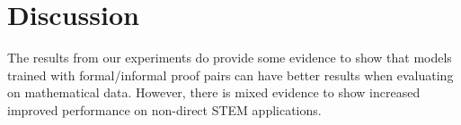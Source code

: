 \section{Discussion}

The results from our experiments do provide some evidence to show that models trained with formal/informal proof pairs can have better results when evaluating on mathematical data. However, there is mixed evidence to show increased improved performance on non-direct STEM applications.
